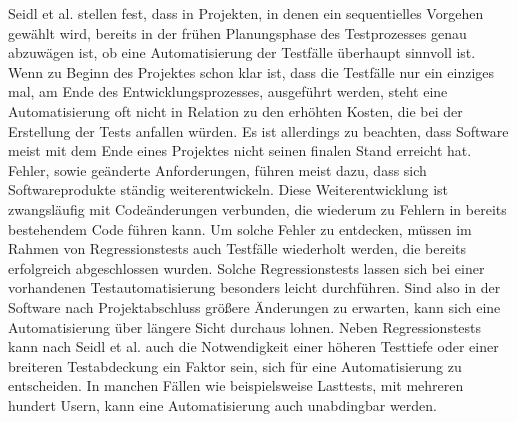 Seidl et al. \cite[vgl. S.22]{seidl_basiswissen_2012} stellen fest, dass in Projekten, in denen ein sequentielles Vorgehen gewählt wird, bereits in der frühen Planungsphase des Testprozesses genau abzuwägen ist, ob eine Automatisierung der Testfälle überhaupt sinnvoll ist.
Wenn zu Beginn des Projektes schon klar ist, dass die Testfälle nur ein einziges mal, am Ende des Entwicklungsprozesses, ausgeführt werden, steht eine Automatisierung oft nicht in Relation zu den erhöhten Kosten, die bei der Erstellung der Tests anfallen würden.
Es ist allerdings zu beachten, dass Software meist mit dem Ende eines Projektes nicht seinen finalen Stand erreicht hat. Fehler, sowie geänderte Anforderungen, führen meist dazu, dass sich Softwareprodukte ständig weiterentwickeln.
Diese Weiterentwicklung ist zwangsläufig mit Codeänderungen verbunden, die wiederum zu Fehlern in bereits bestehendem Code führen kann.
Um solche Fehler zu entdecken, müssen im Rahmen von Regressionstests auch Testfälle wiederholt werden, die bereits erfolgreich abgeschlossen wurden.
Solche Regressionstests lassen sich bei einer vorhandenen Testautomatisierung besonders leicht durchführen. Sind also in der Software nach Projektabschluss größere Änderungen zu erwarten, kann sich eine Automatisierung über längere Sicht durchaus lohnen.
Neben Regressionstests kann nach Seidl et al. \cite[vgl. S.23]{seidl_basiswissen_2012} auch die Notwendigkeit einer höheren Testtiefe oder einer breiteren Testabdeckung ein Faktor sein, sich für eine Automatisierung zu entscheiden.
In manchen Fällen wie beispielsweise Lasttests, mit mehreren hundert Usern, kann eine Automatisierung auch unabdingbar werden.

